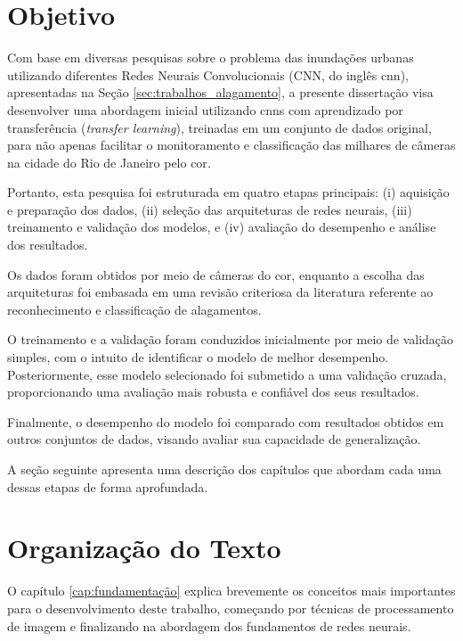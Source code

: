 \section{Objetivo}

Com base em diversas pesquisas sobre o problema das inundações urbanas utilizando diferentes Redes Neurais Convolucionais (CNN, do inglês \acrlong{cnn}),
apresentadas na Seção \ref{sec:trabalhos_alagamento},
a presente dissertação visa desenvolver uma abordagem inicial utilizando \acrshort{cnn}s com aprendizado por transferência (\textit{transfer learning}), treinadas em um conjunto de dados original,
para não apenas facilitar o monitoramento e classificação das milhares de câmeras na cidade do Rio de Janeiro pelo \acrshort{cor}.

Portanto, esta pesquisa foi estruturada em quatro etapas principais: (i) aquisição e preparação dos dados, (ii) seleção das arquiteturas de redes neurais, (iii) treinamento e validação dos modelos, e (iv) avaliação do desempenho e análise dos resultados.

Os dados foram obtidos por meio de câmeras do \acrshort{cor}, enquanto a escolha das arquiteturas foi embasada em uma revisão criteriosa da literatura referente ao reconhecimento e classificação de alagamentos.

O treinamento e a validação foram conduzidos inicialmente por meio de validação simples, com o intuito de identificar o modelo de melhor desempenho. Posteriormente, esse modelo selecionado foi submetido a uma validação cruzada, proporcionando uma avaliação mais robusta e confiável dos seus resultados.

Finalmente, o desempenho do modelo foi comparado com resultados obtidos em outros conjuntos de dados, visando avaliar sua capacidade de generalização.

A seção seguinte apresenta uma descrição dos capítulos que abordam cada uma dessas etapas de forma aprofundada.


\section{Organização do Texto}\label{Organização do texto}

O capítulo \ref{cap:fundamentação} explica brevemente os conceitos mais importantes para o desenvolvimento deste trabalho, começando por técnicas de processamento de imagem e finalizando na abordagem dos fundamentos de redes neurais.


